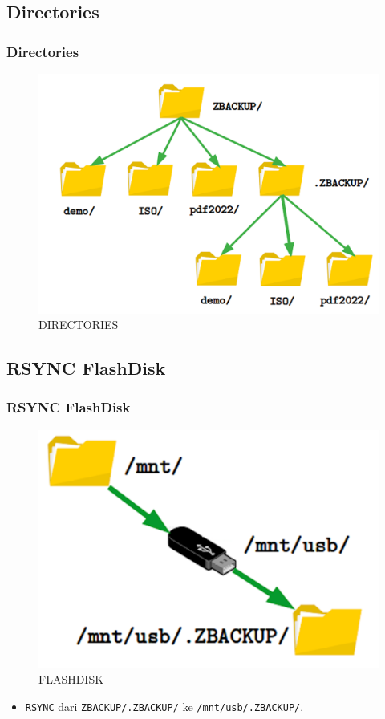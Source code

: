 \documentclass[xcolor=table, notheorems, hyperref={pdfpagelabels=false}]{beamer}
\begin{document}
\begin{frame}[fragile]
\section{Directories}
\frametitle{Directories}
\begin{figure}
\includegraphics[width=0.69\linewidth]{DIRECTORIES}
\caption{DIRECTORIES}
\end{figure}
\end{frame}

\begin{frame}[fragile]
\section{RSYNC FlashDisk}
\frametitle{RSYNC FlashDisk}
\begin{figure}
\includegraphics[width=0.69\linewidth]{FLASHDISK}
\caption{FLASHDISK}
\end{figure}
\begin{itemize}
\item \texttt{RSYNC} dari \texttt{ZBACKUP/.ZBACKUP/} ke \texttt{/mnt/usb/.ZBACKUP/}.
\end{itemize}
\end{frame}
\end{document}

